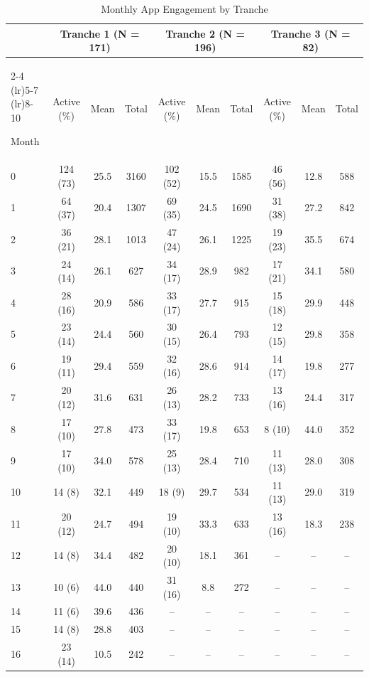 \begin{table}
\centering
\caption{Monthly App Engagement by Tranche}
\label{tab:monthly_engagement_landscape}
\scriptsize
\setlength{\tabcolsep}{3pt}

\begin{tabular*}{\textheight}{@{\extracolsep{\fill}} l ccc | ccc | ccc}
\toprule
& \multicolumn{3}{c}{\textbf{Tranche 1 (N = 171)}} 
& \multicolumn{3}{c}{\textbf{Tranche 2 (N = 196)}} 
& \multicolumn{3}{c}{\textbf{Tranche 3 (N = 82)}} \\
\cmidrule(lr){2-4} \cmidrule(lr){5-7} \cmidrule(lr){8-10}

Month 
& Active (\%) & Mean & Total
& Active (\%) & Mean & Total
& Active (\%) & Mean & Total \\

\midrule

0  & 124 (73) & 25.5 & 3160 & 102 (52) & 15.5 & 1585 & 46 (56) & 12.8 & 588 \\
1  &  64 (37) & 20.4 & 1307 &  69 (35) & 24.5 & 1690 & 31 (38) & 27.2 & 842 \\
2  &  36 (21) & 28.1 & 1013 &  47 (24) & 26.1 & 1225 & 19 (23) & 35.5 & 674 \\
3  &  24 (14) & 26.1 &  627 &  34 (17) & 28.9 &  982 & 17 (21) & 34.1 & 580 \\
4  &  28 (16) & 20.9 &  586 &  33 (17) & 27.7 &  915 & 15 (18) & 29.9 & 448 \\
5  &  23 (14) & 24.4 &  560 &  30 (15) & 26.4 &  793 & 12 (15) & 29.8 & 358 \\
6  &  19 (11) & 29.4 &  559 &  32 (16) & 28.6 &  914 & 14 (17) & 19.8 & 277 \\
7  &  20 (12) & 31.6 &  631 &  26 (13) & 28.2 &  733 & 13 (16) & 24.4 & 317 \\
8  &  17 (10) & 27.8 &  473 &  33 (17) & 19.8 &  653 &  8 (10) & 44.0 & 352 \\
9  &  17 (10) & 34.0 &  578 &  25 (13) & 28.4 &  710 & 11 (13) & 28.0 & 308 \\
10 &  14 (8)  & 32.1 &  449 &  18 (9)  & 29.7 &  534 & 11 (13) & 29.0 & 319 \\
11 &  20 (12) & 24.7 &  494 &  19 (10) & 33.3 &  633 & 13 (16) & 18.3 & 238 \\
12 &  14 (8)  & 34.4 &  482 &  20 (10) & 18.1 &  361 & --      & --   & --  \\
13 &  10 (6)  & 44.0 &  440 &  31 (16) &  8.8 &  272 & --      & --   & --  \\
14 &  11 (6)  & 39.6 &  436 & --       & --   & --   & --      & --   & --  \\
15 &  14 (8)  & 28.8 &  403 & --       & --   & --   & --      & --   & --  \\
16 &  23 (14) & 10.5 &  242 & --       & --   & --   & --      & --   & --  \\


\end{tabular*}
\end{table}
